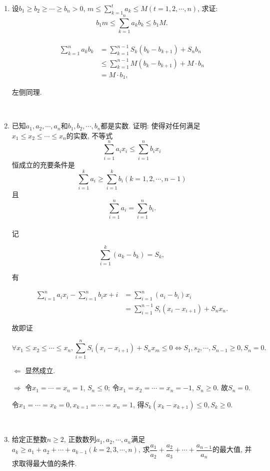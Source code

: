 \documentclass[8pt]{article}
\begin{document}
\begin{enumerate}
		\item 设$b_1 \geq b_2 \geq \cdots \geq b_n > 0$, $\displaystyle m\leq \sum_{k=1}^{t} a_k \leq M (t=1, 2, \cdots, n)$, 求证: $$b_1 m \leq \sum_{k=1}^{n} a_k b_k \leq b_1 M.$$
			~\\

			\begin{align*}
				\sum_{k=1}^{n} a_k b_k &= \sum_{k=1}^{n-1} S_k \left(b_k - b_{k+1}\right) + S_n b_n\\
				&\leq \sum_{k=1}^{n-1} M\left(b_k - b_{k+1}\right) + M\cdot b_n\\
				&= M \cdot b_1,
			\end{align*}

			左侧同理.

		~\\

		\item 已知$a_1, a_2, \cdots, a_n$和$b_1, b_2, \cdots, b_n$都是实数. 证明: 使得对任何满足$x_1 \leq x_2 \leq \cdots \leq x_n$的实数, 不等式$$\sum_{i=1}^{n} a_i x_i \leq \sum_{i=1}^{n} b_i x_i$$恒成立的充要条件是$$\sum_{i=1}^{k} a_i \geq \sum_{i=1}^{k} b_i (k=1, 2, \cdots, n-1)$$且$$\sum_{i=1}^{n} a_i = \sum_{i=1}^{n} b_i.$$
			~\\

			记

			$$\sum_{i=1}^{k} (a_k - b_k) = S_k,$$

			有

			\begin{align*}
			\sum_{i=1}^{n} a_i x_i - \sum_{i=1}^{n} b_i x+i &= \sum_{i=1}^{n} (a_i - b_i) x_i\\
			&= \sum_{i=1}^{n-1} S_i (x_i - x_{i+1}) + S_n x_n.
			\end{align*}

			故即证

			$$\forall x_1 \leq x_2 \leq \cdots \leq x_n, \sum_{i=1}^{n} S_i (x_i - x_{i+1}) + S_n x_m \leq 0 \Leftrightarrow S_1, s_2, \cdots, S_{n-1} \geq 0, S_n = 0.$$

			$\Leftarrow$ 显然成立.

			$\Rightarrow$ 令$x_1 = \cdots = x_n = 1$, $S_n \leq 0$; 令$x_1 = x_2 = \cdots = x_n = -1$, $S_n \geq 0$. 故$S_n = 0$.

			令$x_1 = \cdots = x_k = 0, x_{k=1} = \cdots = x_n = 1$, 得$S_k (x_k - x_{k+1}) \leq 0, S_k \geq 0.$

		~\\

		\item 给定正整数$n\geq 2$, 正数数列$a_1, a_2, \cdots, a_n$满足$a_k \geq a_1 + a_2 + \cdots + a_{k-1} (k=2, 3, \cdots, n)$, 求$\dfrac{a_1}{a_2} + \dfrac{a_2}{a_3} + \cdots + \dfrac{a_{n-1}}{a_n}$的最大值, 并求取得最大值的条件.
			~\\


\end{enumerate}
\end{document}
